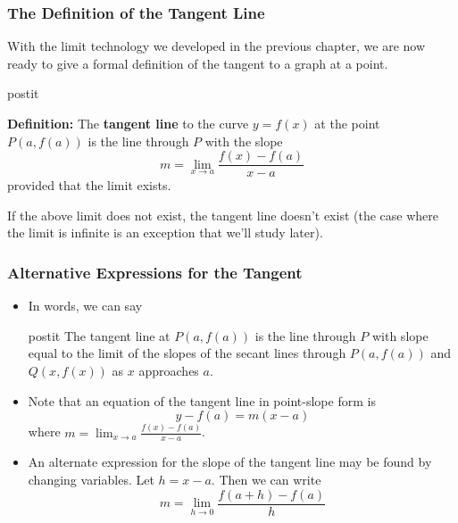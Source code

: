 \documentclass[serif,ignorenonframetext]{beamer}
\newcommand{\ds}{\displaystyle}
\begin{document}
\begin{frame}
  \frametitle{The Definition of the Tangent Line}
  With the limit technology we developed in the previous chapter,
  we are now ready to give a formal definition of the
  tangent to a graph at a point.
  \pause

  \begin{beamercolorbox}{postit}

    \textbf{Definition:} The \textbf{tangent line} to the curve
    $y=f(x)$ at the point $P(a,f(a))$ is the line through $P$
    with the slope 
    \begin{displaymath}
      m = \lim_{x\to a} \frac{f(x)-f(a)}{x-a}
    \end{displaymath}
    provided that the limit exists.

  \end{beamercolorbox}
  \pause

  If the above limit does not exist, the tangent line doesn't exist
  (the case where the limit is infinite is an exception that we'll
  study later).
\end{frame}

\begin{frame}
  \frametitle{Alternative Expressions for the Tangent}
  \begin{itemize}
  \item In words, we can say
  \begin{beamercolorbox}{postit}
    The tangent line at $P(a,f(a))$ is the line through $P$ with slope
    equal to the limit of the slopes of the secant lines through
    $P(a,f(a))$ and $Q(x,f(x))$ as $x$ approaches $a$.
  \end{beamercolorbox}
  \pause
  \item Note that an equation of the tangent line in point-slope form
    is 
    \begin{displaymath}
      y-f(a) = m(x-a)
    \end{displaymath}
    where $\ds m = \lim_{x\to a} \frac{f(x)-f(a)}{x-a}$.
  \pause
  \item An alternate expression for the slope of the tangent line may be
    found by changing variables.  Let $h=x-a$.  Then we can write
  \pause
    \begin{displaymath}
      m = \lim_{h\to 0} \frac{f(a+h)-f(a)}{h}
    \end{displaymath}
  \end{itemize}
\end{frame}
\end{document}
